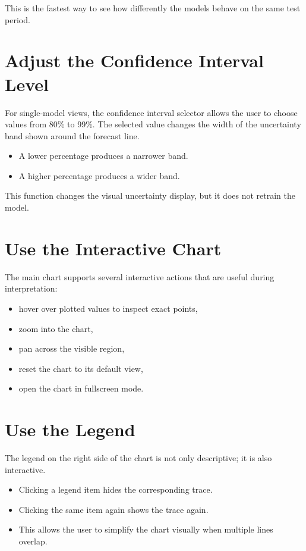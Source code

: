 This is the fastest way to see how differently the models behave on the same test period.

\section{Adjust the Confidence Interval Level}

For single-model views, the confidence interval selector allows the user to choose values from 80\% to 99\%. The selected value changes the width of the uncertainty band shown around the forecast line.

\begin{itemize}
    \item A lower percentage produces a narrower band.
    \item A higher percentage produces a wider band.
\end{itemize}

This function changes the visual uncertainty display, but it does not retrain the model.

\section{Use the Interactive Chart}

The main chart supports several interactive actions that are useful during interpretation:

\begin{itemize}
    \item hover over plotted values to inspect exact points,
    \item zoom into the chart,
    \item pan across the visible region,
    \item reset the chart to its default view,
    \item open the chart in fullscreen mode.
\end{itemize}

\section{Use the Legend}

The legend on the right side of the chart is not only descriptive; it is also interactive.

\begin{itemize}
    \item Clicking a legend item hides the corresponding trace.
    \item Clicking the same item again shows the trace again.
    \item This allows the user to simplify the chart visually when multiple lines overlap.
\end{itemize}

